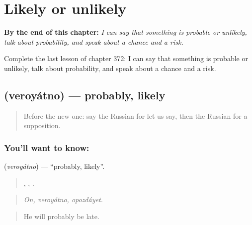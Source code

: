 
\chapter{Likely or unlikely}
\label{ch:ru-likely-or-unlikely}

\begin{chapteropening}
\textbf{By the end of this chapter:} \emph{I can say that something is probable or unlikely, talk about probability, and speak about a chance and a risk.}

Complete the last lesson of chapter 372: I can say that something is probable or unlikely, talk about probability, and speak about a chance and a risk.
\end{chapteropening}

\section[\texorpdfstring{\ru{вероятно} (veroyátno)}{вероятно (veroyátno)}]{ (veroyátno) — probably, likely}

\label{lesson:RU-C372-veroyatno}



\begin{quote}
Before the new one: say the Russian for let us say, then the Russian for a supposition.
\end{quote}

\subsection*{You'll want to know: }
\textbf{} (\emph{veroyátno}) — \textquotedblleft{}probably, likely\textquotedblright{}.

\begin{quote}
, , .
\end{quote}

\begin{quote}
\emph{On, veroyátno, opozdáyet.}
\end{quote}

\begin{quote}
He will probably be late.
\end{quote}

